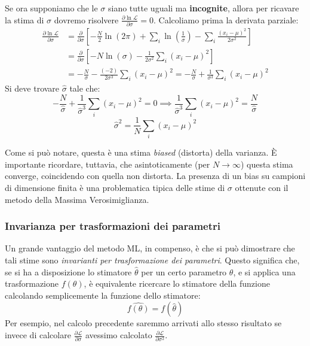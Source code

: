 \documentclass[openany,a4paper,12pt]{book}
\providecommand{\mathscr}[1]{\mathcal{#1}}
\theoremstyle{remark}
\begin{document}
Se ora supponiamo che le $\sigma$ siano tutte uguali ma \textbf{incognite}, allora per ricavare la stima di $\sigma$ dovremo risolvere $\frac{\partial \ln \mathscr{L}}{\partial \sigma} = 0$. Calcoliamo prima la derivata parziale:
\begin{align*}
    \frac{\partial \ln \mathscr{L}}{\partial \sigma} &= \frac{\partial}{\partial \sigma} \left[ -\frac{N}{2}\ln(2\pi) + \sum_i \ln\left(\frac{1}{\sigma}\right) - \sum_i \frac{(x_i - \mu)^2}{2\sigma^2} \right] \\
    &= \frac{\partial}{\partial \sigma} \left[ -N \ln(\sigma) - \frac{1}{2\sigma^2} \sum_i (x_i - \mu)^2 \right] \\
    &= -\frac{N}{\sigma} - \frac{(-2)}{2\sigma^3} \sum_i (x_i - \mu)^2 = -\frac{N}{\sigma} + \frac{1}{\sigma^3} \sum_i (x_i - \mu)^2
\end{align*}
Si deve trovare $\hat{\sigma}$ tale che:
\begin{equation}
    -\frac{N}{\hat{\sigma}} + \frac{1}{\hat{\sigma}^3} \sum_i (x_i - \mu)^2 = 0 \implies \frac{1}{\hat{\sigma}^3} \sum_i (x_i - \mu)^2 = \frac{N}{\hat{\sigma}}
\end{equation}
\begin{equation}
    \boxed{ \hat{\sigma}^2 = \frac{1}{N} \sum_i (x_i - \mu)^2 }
\end{equation}

Come si può notare, questa è una stima \textit{biased} (distorta) della varianza. È importante ricordare, tuttavia, che asintoticamente (per $N \to \infty$) questa stima converge, coincidendo con quella non distorta. La presenza di un bias su campioni di dimensione finita è una problematica tipica delle stime di $\sigma$ ottenute con il metodo della Massima Verosimiglianza.

\subsubsection{Invarianza per trasformazioni dei parametri}

Un grande vantaggio del metodo ML, in compenso, è che si può dimostrare che tali stime sono \textit{invarianti per trasformazione dei parametri}. Questo significa che, se si ha a disposizione lo stimatore $\hat{\theta}$ per un certo parametro $\theta$, e si applica una trasformazione $f(\theta)$, è equivalente ricercare lo stimatore della funzione calcolando semplicemente la funzione dello stimatore:
\begin{equation}
    \widehat{f(\theta)} = f(\hat{\theta})
\end{equation}
Per esempio, nel calcolo precedente saremmo arrivati allo stesso risultato se invece di calcolare $\frac{\partial \mathscr{L}}{\partial \sigma}$ avessimo calcolato $\frac{\partial \mathscr{L}}{\partial \sigma^2}$.
\end{document}
